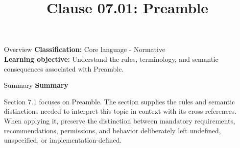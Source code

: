\documentclass[10pt,letterpaper]{article}
\title{Clause 07.01: Preamble}
\author{}
\date{}
\begin{document}
\maketitle
\begin{CornellOverviewBox}{Overview}
\textbf{Classification:} Core language - Normative\\[2pt]
\textbf{Learning objective:} Understand the rules, terminology, and semantic consequences associated with Preamble.
\end{CornellOverviewBox}\begin{CornellSummaryBox}{Summary}
{\sffamily\bfseries\color{Accent} Summary}\par\vspace{3pt}Section 7.1 focuses on Preamble. The section supplies the rules and semantic distinctions needed to interpret this topic in context with its cross-references. When applying it, preserve the distinction between mandatory requirements, recommendations, permissions, and behavior deliberately left undefined, unspecified, or implementation-defined.
\end{CornellSummaryBox}
\end{document}
